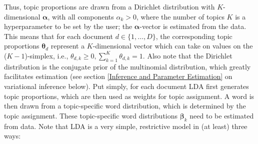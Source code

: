 \noindent
Thus, topic proportions are drawn from a Dirichlet distribution with $K$-dimensional $\boldsymbol{\alpha}$, with all components $\alpha_k > 0$, where the number of topics $K$ is a hyperparameter to be set by the user; the $\boldsymbol{\alpha}$-vector is estimated from the data. This means that for each document $d \in \{1,\dots,D\}$, the corresponding topic proportions $\boldsymbol{\theta}_d$ represent a $K$-dimensional vector which can take on values on the ($K-1$)-simplex, i.e., $\theta_{d,k} \geq 0, \sum_{k=1}^{K}\theta_{d,k}=1$. Also note that the Dirichlet distribution is the conjugate prior of the multinomial distribution, which greatly facilitates estimation (see section \ref{Inference and Parameter Estimation} on variational inference below). Put simply, for each document LDA first generates topic proportions, which are then used as weights for topic assignment. A word is then drawn from a topic-specific word distribution, which is determined by the topic assignment. These topic-specific word distributions $\boldsymbol{\beta}_k$ need to be estimated from data.
Note that LDA is a very simple, restrictive model in (at least) three ways:

